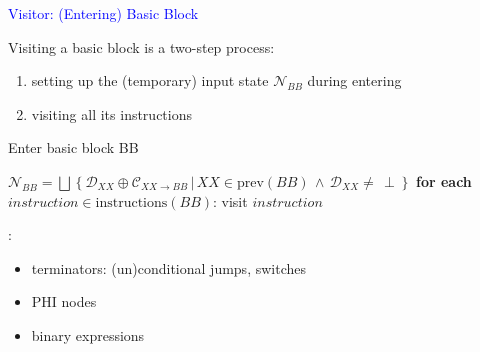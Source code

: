 \begin{frame}[fragile]{\textcolor{blue}{Visitor: (Entering) Basic Block}}

Visiting a basic block is a two-step process:
\begin{enumerate}
\item setting up the (temporary) input state $\mathcal{N}_{BB}$ during entering 
\item visiting all its instructions
\end{enumerate}

\begin{algorithm}[H]
\caption{Enter basic block BB}  %
\begin{algorithmic}[1]
\State $\mathcal{N}_{BB}= \bigsqcup \left\lbrace \mathcal{D}_{XX} \oplus \mathcal{C}_{XX\rightarrow BB} \,|\, XX \in \text{prev}(BB)\,\wedge\,\mathcal{D}_{XX}\neq\, \perp \right\rbrace$
\State \textbf{for each} $instruction \in \text{instructions}(BB)$:
\State \qquad visit $instruction$
\EndProcedure
\end{algorithmic}
\end{algorithm}
\underline{}:
\begin{itemize}
\item terminators: (un)conditional jumps, switches
\item PHI nodes
\item binary expressions
\end{itemize}
\end{frame}


